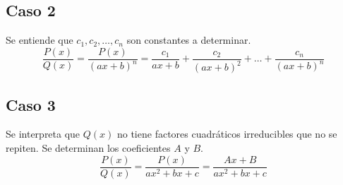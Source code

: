 \documentclass[letterpaper, 12pt]{article}
\begin{document}
\begin{justify}
        \subsection{Caso 2}
        \justify
        Se entiende que \(c_1,c_2,\dots,c_n\) son constantes a determinar.
        {\large \[\frac{P(x)}{Q(x)}=\frac{P(x)}{(ax+b)^n}=\frac{c_1}{ax+b}+\frac{c_2}{(ax+b)^2}+\dots+\frac{c_n}{(ax+b)^n}\]}
        \subsection{Caso 3}        
        \justify
        Se interpreta que \(Q(x)\) no tiene factores cuadráticos irreducibles que no se repiten. Se determinan los coeficientes \(A\) y \(B\).
        {\large \[\frac{P(x)}{Q(x)}=\frac{P(x)}{ax^2+bx+c}=\frac{Ax+B}{ax^2+bx+c}\]}

    \end{justify}
\end{document}

